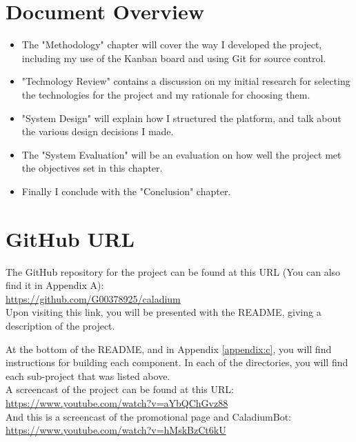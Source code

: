 
\section{Document Overview}
\begin{itemize}
  \item The "Methodology" chapter will cover the way I developed the project,
  including my use of the Kanban board and using Git for source control.
  \item "Technology Review" contains a discussion on my initial research for selecting
  the technologies for the project and my rationale for choosing them.
  \item "System Design" will explain how I structured the platform,
  and talk about the various design decisions I made.
  \item The "System Evaluation" will be an evaluation on how well
  the project met the objectives set in this chapter.
  \item Finally I conclude with the "Conclusion" chapter.
\end{itemize}

\section{GitHub URL}
The GitHub repository for the project can be found at this URL
(You can also find it in Appendix A):\\
\href{https://github.com/G00378925/caladium}{https://github.com/G00378925/caladium} \\

Upon visiting this link, you will be presented with the README,
giving a description of the project.

At the bottom of the README, and in Appendix \ref{appendix:c},
you will find instructions for building each component.
In each of the directories, you will find each sub-project that was listed above. \\

A screencast of the project can be found at this URL: \\
\href{https://www.youtube.com/watch?v=aYbQChGvz88}{https://www.youtube.com/watch?v=aYbQChGvz88} \\

And this is a screencast of the promotional page and CaladiumBot: \\
\href{https://www.youtube.com/watch?v=hMskBzCt6kU}{https://www.youtube.com/watch?v=hMskBzCt6kU}
